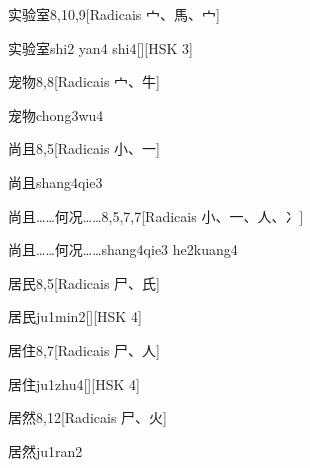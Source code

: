 \begin{entry}{实验室}{8,10,9}[Radicais ⼧、⾺、⼧]
  \begin{phonetics}{实验室}{shi2 yan4 shi4}[][HSK 3]
  \end{phonetics}
\end{entry}

\begin{entry}{宠物}{8,8}[Radicais ⼧、⽜]
  \begin{phonetics}{宠物}{chong3wu4}
  \end{phonetics}
\end{entry}

\begin{entry}{尚且}{8,5}[Radicais ⼩、⼀]
  \begin{phonetics}{尚且}{shang4qie3}
  \end{phonetics}
\end{entry}

\begin{entry}{尚且……何况……}{8,5,7,7}[Radicais ⼩、⼀、⼈、⼎]
  \begin{phonetics}{尚且……何况……}{shang4qie3 he2kuang4}
  \end{phonetics}
\end{entry}

\begin{entry}{居民}{8,5}[Radicais ⼫、⽒]
  \begin{phonetics}{居民}{ju1min2}[][HSK 4]
  \end{phonetics}
\end{entry}

\begin{entry}{居住}{8,7}[Radicais ⼫、⼈]
  \begin{phonetics}{居住}{ju1zhu4}[][HSK 4]
  \end{phonetics}
\end{entry}

\begin{entry}{居然}{8,12}[Radicais ⼫、⽕]
  \begin{phonetics}{居然}{ju1ran2}
  \end{phonetics}
\end{entry}

